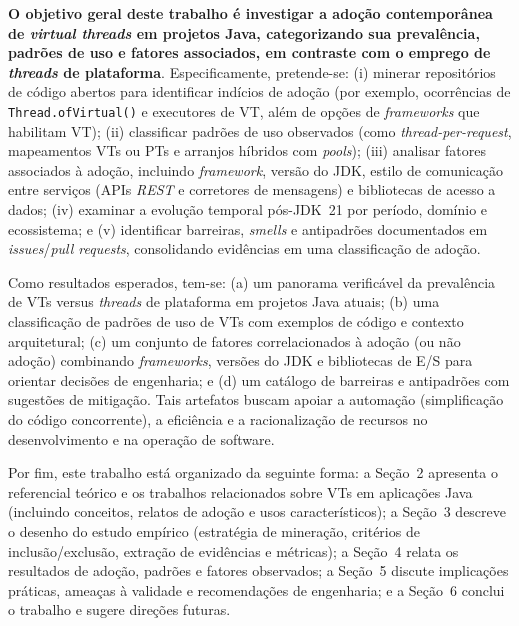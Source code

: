 \textbf{O objetivo geral deste trabalho é investigar a adoção contemporânea de \textit{virtual threads} em projetos Java, categorizando sua prevalência, padrões de uso e fatores associados, em contraste com o emprego de \textit{threads} de plataforma}. Especificamente, pretende-se: (i) minerar repositórios de código abertos para identificar indícios de adoção (por exemplo, ocorrências de \texttt{Thread.ofVirtual()} e executores de VT, além de opções de \textit{frameworks} que habilitam VT); (ii) classificar padrões de uso observados (como \textit{thread-per-request}, mapeamentos VTs ou PTs e arranjos híbridos com \textit{pools}); (iii) analisar fatores associados à adoção, incluindo \textit{framework}, versão do JDK, estilo de comunicação entre serviços (APIs \textit{REST} e corretores de mensagens) e bibliotecas de acesso a dados; (iv) examinar a evolução temporal pós-JDK~21 por período, domínio e ecossistema; e (v) identificar barreiras, \textit{smells} e antipadrões documentados em \textit{issues}/\textit{pull requests}, consolidando evidências em uma classificação de adoção.

Como resultados esperados, tem-se: (a) um panorama verificável da prevalência de VTs versus \textit{threads} de plataforma em projetos Java atuais; (b) uma classificação de padrões de uso de VTs com exemplos de código e contexto arquitetural; (c) um conjunto de fatores correlacionados à adoção (ou não adoção) combinando \textit{frameworks}, versões do JDK e bibliotecas de E/S para orientar decisões de engenharia; e (d) um catálogo de barreiras e antipadrões com sugestões de mitigação. Tais artefatos buscam apoiar a automação (simplificação do código concorrente), a eficiência e a racionalização de recursos no desenvolvimento e na operação de software.

Por fim, este trabalho está organizado da seguinte forma: a Seção~2 apresenta o referencial teórico e os trabalhos relacionados sobre VTs em aplicações Java (incluindo conceitos, relatos de adoção e usos característicos); a Seção~3 descreve o desenho do estudo empírico (estratégia de mineração, critérios de inclusão/exclusão, extração de evidências e métricas); a Seção~4 relata os resultados de adoção, padrões e fatores observados; a Seção~5 discute implicações práticas, ameaças à validade e recomendações de engenharia; e a Seção~6 conclui o trabalho e sugere direções futuras.